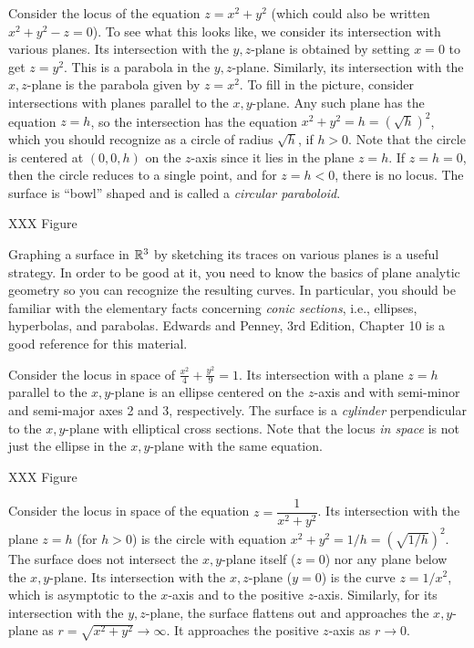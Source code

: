 \begin{example}
	Consider the locus of the equation $z = x^2 + y^2$ (which could
	also be written $x^2 + y^2 - z = 0$).  To see what this looks like,
	we consider its intersection with various planes.   Its intersection
	with the $y,z$-plane is obtained by setting $x = 0$ to get
	$z = y^2$.  This is a parabola in the $y,z$-plane.  
	Similarly, its intersection with the $x,z$-plane is the parabola
	given by $z = x^2$.   To fill in the picture,  consider
	intersections with planes parallel to the $x,y$-plane.  Any
	such plane has the equation $z = h$, so the intersection has the equation
	$x^2 + y^2 = h = (\sqrt h)^2$, which you should recognize as a circle
	of radius $\sqrt h$, if $h > 0$.  Note that the circle is
	centered at $(0,0,h)$ on the $z$-axis since it lies in the plane $z = h$.
	If $z = h = 0$, then the circle reduces to a single point, and for 
	$z = h < 0$, there is no locus.
	The surface is ``bowl'' shaped and is called a \emph{circular
	paraboloid}.

	XXX Figure
\end{example}

Graphing a surface in $\mathbb{R}^3$ by sketching its traces on various
planes is a useful strategy.  In order to be good at it, you need
to know the basics of plane analytic geometry so you can recognize
the resulting curves.  In particular, you should be familiar with
the elementary facts concerning \emph{conic sections}, i.e.,
ellipses, hyperbolas, and parabolas.   Edwards and Penney, 3rd Edition,
Chapter 10 is a good reference for this material.

\begin{example}
	Consider the locus in space of $\displaystyle{\frac{x^2}4 +
	\frac{y^2} 9} = 1$.   Its intersection with a plane $z = h$
	parallel to the $x,y$-plane is an ellipse centered on the $z$-axis
	and with semi-minor and semi-major axes  2 and 3, respectively.   The surface
	is a \emph{cylinder} perpendicular to the $x,y$-plane with
	elliptical cross sections.
	Note that the locus \emph{in space} is not just the ellipse
	in the $x,y$-plane with the same equation.
	
	XXX Figure
\end{example}

\begin{example}
	Consider the locus in space of the equation
	$z = \dfrac 1{x^2 + y^2}$.   Its intersection with the plane $z = h$
	(for $h > 0$) is the circle with equation
	$ x^2 + y^2 = 1/h = (\sqrt{1/h})^2$.   The surface does not intersect
	the $x,y$-plane itself ($z = 0$) nor any plane below the $x,y$-plane.
	Its intersection with the $x,z$-plane ($y = 0$) is the curve
	$z = 1/x^2$, which is asymptotic to the $x$-axis
	and to the positive $z$-axis.  Similarly, for its intersection
	with the $y,z$-plane,   the surface flattens out and approaches the
	$x,y$-plane as $r = \sqrt{x^2 + y^2} \to \infty$.  It approaches the
	positive $z$-axis as $r \to 0$.
\end{example}

